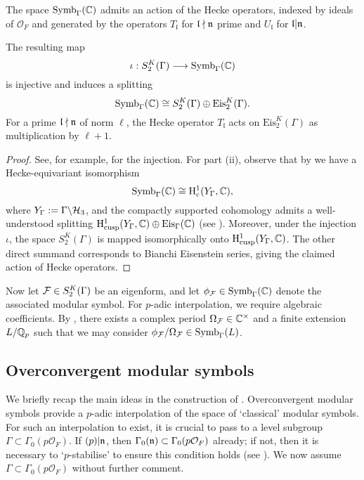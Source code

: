 \documentclass[a4paper,10pt]{article}
\newcommand{\fl}{\mathfrak{l}}
\newcommand{\cO}{\mathcal{O}}
\numberwithin{equation}{section}
\begin{document}
The space $\mathrm{Symb}_\Gamma(\mathbb{C})$ admits an action of the Hecke operators, indexed by ideals of $\cO_F$ and generated by the operators $T_{\fl}$ for $\fl\nmid\n$ prime and $U_{\fl}$ for $\fl|\n$. 

\begin{proposition}
 The resulting map 
    \[
        \iota : S_2^K(\Gamma) \longrightarrow \mathrm{Symb}_\Gamma(\mathbb{C})
    \]
    is injective and induces a splitting
    \[
        \mathrm{Symb}_\Gamma(\mathbb{C}) \cong S_2^K(\Gamma) \oplus \mathrm{Eis}_2^K(\Gamma).
    \]
    For a prime $\fl\nmid \n$ of norm $\ell$, the Hecke operator $T_{\fl}$ acts on $\mathrm{Eis}_2^K(\Gamma)$ as multiplication by $\ell+1$.
\end{proposition}
\begin{proof}
    See, for example, \cite{Wil17} for the injection. For part (ii), observe that by \cite[Lemma 8.2]{BW17} we have a Hecke-equivariant isomorphism
    \[
        \mathrm{Symb}_\Gamma(\mathbb{C}) \cong \mathrm{H}^1_{\mathrm{c}}(Y_\Gamma, \mathbb{C}),
    \]
    where $Y_\Gamma := \Gamma\backslash\mathcal{H}_3$, and the compactly supported cohomology admits a well-understood splitting $\mathrm{H}^1_{\mathrm{cusp}}(Y_\Gamma,\mathbb{C}) \oplus \mathrm{Eis}_\Gamma(\mathbb{C})$ (see \cite[\S3.2.5]{Har87}). Moreover, under the injection $\iota$, the space $S_2^K(\Gamma)$ is mapped isomorphically onto $\mathrm{H}^1_{\mathrm{cusp}}(Y_\Gamma,\mathbb{C})$. The other direct summand corresponds to Bianchi Eisenstein series, giving the claimed action of Hecke operators.
\end{proof}

Now let $\mathcal{F} \in S_2^K(\Gamma)$ be an eigenform, and let $\phi_{\mathcal{F}} \in \mathrm{Symb}_\Gamma(\mathbb{C})$ denote the associated modular symbol. For $p$-adic interpolation, we require algebraic coefficients. By \cite[\S8]{Hid94}, there exists a complex period $\Omega_{\mathcal{F}} \in \mathbb{C}^\times$ and a finite extension $L/\mathbb{Q}_p$ such that we may consider $\phi_{\mathcal{F}}/\Omega_{\mathcal{F}} \in \mathrm{Symb}_{\Gamma}(L)$.



\subsection{Overconvergent modular symbols}
We briefly recap the main ideas in the construction of \cite{Wil17}. Overconvergent modular symbols provide a $p$-adic interpolation of the space of `classical' modular symbols. For such an interpolation to exist, it is crucial to pass to a level subgroup $\Gamma \subset \Gamma_0(p\cO_F).$ If $(p)|\mathfrak{n}$, then $\Gamma_0(\n) \subset \Gamma_0(p\cO_F)$ already; if not, then it is necessary to `$p$-stabilise' to ensure this condition holds (see \cite[\S2.4]{BW18}). We now assume $\Gamma \subset \Gamma_0(p\cO_F)$ without further comment.
\end{document}
